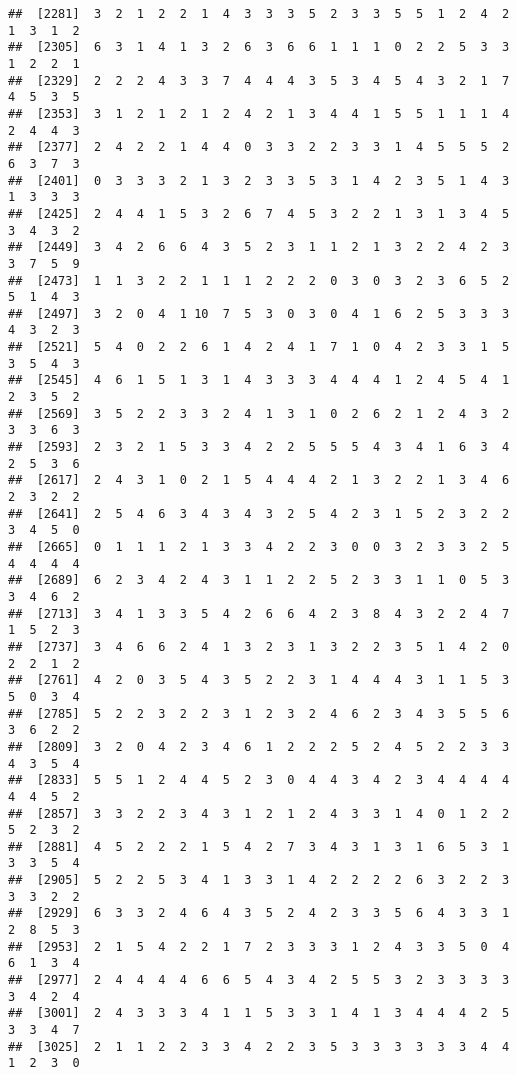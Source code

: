 \documentclass[
]{article}
\begin{document}
\begin{verbatim}
##  [2281]  3  2  1  2  2  1  4  3  3  3  5  2  3  3  5  5  1  2  4  2  1  3  1  2
##  [2305]  6  3  1  4  1  3  2  6  3  6  6  1  1  1  0  2  2  5  3  3  1  2  2  1
##  [2329]  2  2  2  4  3  3  7  4  4  4  3  5  3  4  5  4  3  2  1  7  4  5  3  5
##  [2353]  3  1  2  1  2  1  2  4  2  1  3  4  4  1  5  5  1  1  1  4  2  4  4  3
##  [2377]  2  4  2  2  1  4  4  0  3  3  2  2  3  3  1  4  5  5  5  2  6  3  7  3
##  [2401]  0  3  3  3  2  1  3  2  3  3  5  3  1  4  2  3  5  1  4  3  1  3  3  3
##  [2425]  2  4  4  1  5  3  2  6  7  4  5  3  2  2  1  3  1  3  4  5  3  4  3  2
##  [2449]  3  4  2  6  6  4  3  5  2  3  1  1  2  1  3  2  2  4  2  3  3  7  5  9
##  [2473]  1  1  3  2  2  1  1  1  2  2  2  0  3  0  3  2  3  6  5  2  5  1  4  3
##  [2497]  3  2  0  4  1 10  7  5  3  0  3  0  4  1  6  2  5  3  3  3  4  3  2  3
##  [2521]  5  4  0  2  2  6  1  4  2  4  1  7  1  0  4  2  3  3  1  5  3  5  4  3
##  [2545]  4  6  1  5  1  3  1  4  3  3  3  4  4  4  1  2  4  5  4  1  2  3  5  2
##  [2569]  3  5  2  2  3  3  2  4  1  3  1  0  2  6  2  1  2  4  3  2  3  3  6  3
##  [2593]  2  3  2  1  5  3  3  4  2  2  5  5  5  4  3  4  1  6  3  4  2  5  3  6
##  [2617]  2  4  3  1  0  2  1  5  4  4  4  2  1  3  2  2  1  3  4  6  2  3  2  2
##  [2641]  2  5  4  6  3  4  3  4  3  2  5  4  2  3  1  5  2  3  2  2  3  4  5  0
##  [2665]  0  1  1  1  2  1  3  3  4  2  2  3  0  0  3  2  3  3  2  5  4  4  4  4
##  [2689]  6  2  3  4  2  4  3  1  1  2  2  5  2  3  3  1  1  0  5  3  3  4  6  2
##  [2713]  3  4  1  3  3  5  4  2  6  6  4  2  3  8  4  3  2  2  4  7  1  5  2  3
##  [2737]  3  4  6  6  2  4  1  3  2  3  1  3  2  2  3  5  1  4  2  0  2  2  1  2
##  [2761]  4  2  0  3  5  4  3  5  2  2  3  1  4  4  4  3  1  1  5  3  5  0  3  4
##  [2785]  5  2  2  3  2  2  3  1  2  3  2  4  6  2  3  4  3  5  5  6  3  6  2  2
##  [2809]  3  2  0  4  2  3  4  6  1  2  2  2  5  2  4  5  2  2  3  3  4  3  5  4
##  [2833]  5  5  1  2  4  4  5  2  3  0  4  4  3  4  2  3  4  4  4  4  4  4  5  2
##  [2857]  3  3  2  2  3  4  3  1  2  1  2  4  3  3  1  4  0  1  2  2  5  2  3  2
##  [2881]  4  5  2  2  2  1  5  4  2  7  3  4  3  1  3  1  6  5  3  1  3  3  5  4
##  [2905]  5  2  2  5  3  4  1  3  3  1  4  2  2  2  2  6  3  2  2  3  3  3  2  2
##  [2929]  6  3  3  2  4  6  4  3  5  2  4  2  3  3  5  6  4  3  3  1  2  8  5  3
##  [2953]  2  1  5  4  2  2  1  7  2  3  3  3  1  2  4  3  3  5  0  4  6  1  3  4
##  [2977]  2  4  4  4  4  6  6  5  4  3  4  2  5  5  3  2  3  3  3  3  3  4  2  4
##  [3001]  2  4  3  3  3  4  1  1  5  3  3  1  4  1  3  4  4  4  2  5  3  3  4  7
##  [3025]  2  1  1  2  2  3  3  4  2  2  3  5  3  3  3  3  3  3  4  4  1  2  3  0

\end{verbatim}
\end{document}
